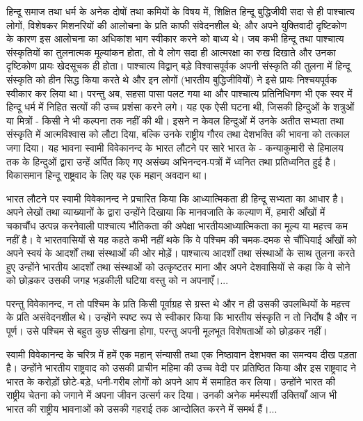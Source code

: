 हिन्दू समाज तथा धर्म के अनेक दोषों तथा कमियों के विषय में, शिक्षित हिन्दू बुद्धिजीवी सदा से ही पाश्चात्य लोगों, विशेषकर मिशनरियों की आलोचना के प्रति काफी संवेदनशील थे; और अपने युक्तिवादी दृष्टिकोण के कारण इस आलोचना का अधिकांश भाग स्वीकार करने को बाध्य थे। जब कभी हिन्दू तथा पाश्चात्य संस्कृतियों का तुलनात्मक मूल्यांकन होता, तो वे लोग सदा ही आत्मरक्षा का रुख दिखाते और उनका दृष्टिकोण प्रायः खेदसूचक ही होता। पाश्चात्य विद्वान् बड़े विश्वासपूर्वक अपनी संस्कृति की तुलना में हिन्दू संस्कृति को हीन सिद्ध किया करते थे और इन लोगों (भारतीय बुद्धिजीवियों) ने इसे प्रायः निश्चयपूर्वक स्वीकार कर लिया था। परन्तु अब, सहसा पासा पलट गया था और पाश्चात्य प्रतिनिधिगण भी एक स्वर में हिन्दू धर्म में निहित सत्यों की उच्च प्रशंसा करने लगे। यह एक ऐसी घटना थी, जिसकी हिन्दुओं के शत्रुओं या मित्रों - किसी ने भी कल्पना तक नहीं की थी। इसने न केवल हिन्दुओं में उनके अतीत सभ्यता तथा संस्कृति में आत्मविश्वास को लौटा दिया, बल्कि उनके राष्ट्रीय गौरव तथा देशभक्ति की भावना को तत्काल जगा दिया। यह भावना स्वामी विवेकानन्द के भारत लौटने पर सारे भारत के - कन्याकुमारी से हिमालय तक के हिन्दुओं द्वारा उन्हें अर्पित किए गए असंख्य अभिनन्दन-पत्रों में ध्वनित तथा प्रतिध्वनित हुई है। विकासमान हिन्दू राष्ट्रवाद के लिए यह एक महान् अवदान था। 

भारत लौटने पर स्वामी विवेकानन्द ने प्रचारित किया कि आध्यात्मिकता ही हिन्दू सभ्यता का आधार है। अपने लेखों तथा व्याख्यानों के द्वारा उन्होंने दिखाया कि मानवजाति के कल्याण में, हमारी आँखों में चकाचौंध उत्पन्न करनेवाली पाश्चात्य भौतिकता की अपेक्षा भारतीय\break आध्यात्मिकता का मूल्य या महत्त्व कम नहीं है। वे भारतवासियों से यह कहते कभी नहीं थके कि वे पश्चिम की चमक-दमक से चौंधियाई आँखों को अपने स्वयं के आदर्शों तथा संस्थाओं की ओर मोड़ें। पाश्चात्य आदर्शों तथा संस्थाओं के साथ तुलना करते हुए उन्होंने भारतीय आदर्शों तथा संस्थाओं को उत्कृष्टतर माना और अपने देशवासियों से कहा कि वे सोने को छोड़कर उसकी जगह भड़कीली घटिया वस्तु को न अपनाएँ।... 

परन्तु विवेकानन्द, न तो पश्चिम के प्रति किसी पूर्वाग्रह से ग्रस्त थे और न ही उसकी उपलब्धियों के महत्त्व के प्रति असंवेदनशील थे। उन्होंने स्पष्ट रूप से स्वीकार किया कि भारतीय संस्कृति न तो निर्दोष है और न पूर्ण। उसे पश्चिम से बहुत कुछ सीखना होगा, परन्तु अपनी मूलभूत विशेषताओं को छोड़कर नहीं। 

स्वामी विवेकानन्द के चरित्र में हमें एक महान् संन्यासी तथा एक निष्ठावान देशभक्त का समन्वय दीख पड़ता है। उन्होंने भारतीय राष्ट्रवाद को उसकी प्राचीन महिमा की उच्च वेदी पर प्रतिष्ठित किया और इस राष्ट्रवाद ने भारत के करोड़ों छोटे-बड़े, धनी-गरीब लोगों को अपने आप में समाहित कर लिया। उन्होंने भारत की राष्ट्रीय चेतना को जगाने में अपना जीवन उत्सर्ग कर दिया। उनकी अनेक मर्मस्पर्शी उक्तियाँ आज भी भारत की राष्ट्रीय भावनाओं को उसकी गहराई तक आन्दोलित करने में समर्थ हैं।... 

